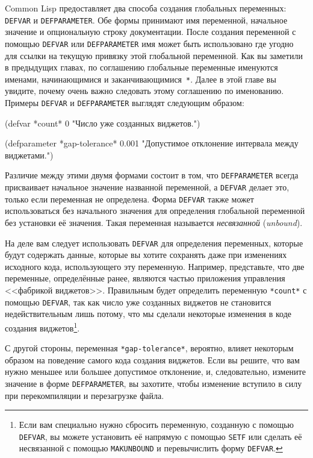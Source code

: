 Common Lisp предоставляет два способа создания глобальных переменных: \lstinline{DEFVAR} и
\lstinline{DEFPARAMETER}. Обе формы принимают имя переменной, начальное значение и
опциональную строку документации. После создания переменной с помощью \lstinline{DEFVAR} или
\lstinline{DEFPARAMETER} имя может быть использовано где угодно для ссылки на текущую
привязку этой глобальной переменной. Как вы заметили в предыдущих главах, по соглашению
глобальные переменные именуются именами, начинающимися и заканчивающимися~\lstinline{*}.  Далее в этой
главе вы увидите, почему очень важно следовать этому соглашению по именованию. Примеры
\lstinline{DEFVAR} и \lstinline{DEFPARAMETER} выглядят следующим образом:

\begin{myverb}
(defvar *count* 0
  "Число уже созданных виджетов.")

(defparameter *gap-tolerance* 0.001
  "Допустимое отклонение интервала между виджетами.")
\end{myverb}

Различие между этими двумя формами состоит в том, что \lstinline{DEFPARAMETER} всегда
присваивает начальное значение названной переменной, а \lstinline{DEFVAR} делает это, только
если переменная не определена. Форма \lstinline{DEFVAR} также может использоваться без
начального значения для определения глобальной переменной без установки её значения. Такая
переменная называется \textit{несвязанной} (\textit{unbound}).

На деле вам следует использовать \lstinline{DEFVAR} для определения переменных, которые
будут содержать данные, которые вы хотите сохранять даже при изменениях исходного кода,
использующего эту переменную. Например, представьте, что две переменные, определённые
ранее, являются частью приложения управления <<фабрикой
виджетов>>. Правильным будет определить переменную \lstinline{*count*} с помощью
\lstinline{DEFVAR}, так как число уже созданных виджетов не становится недействительным
лишь потому, что мы сделали некоторые изменения в коде создания виджетов\footnote{Если вам
  специально нужно сбросить переменную, созданную с помощью \lstinline{DEFVAR}, вы можете
  установить её напрямую с помощью \lstinline{SETF} или сделать её несвязанной с помощью
  \lstinline{MAKUNBOUND} и перевычислить форму \lstinline{DEFVAR}.}.

С другой стороны, переменная \lstinline{*gap-tolerance*}, вероятно, влияет некоторым образом на
поведение самого кода создания виджетов. Если вы решите, что вам нужно меньшее или большее
допустимое отклонение, и, следовательно, измените значение в форме
\lstinline{DEFPARAMETER}, вы захотите, чтобы изменение вступило в силу при перекомпиляции
и перезагрузке файла.


